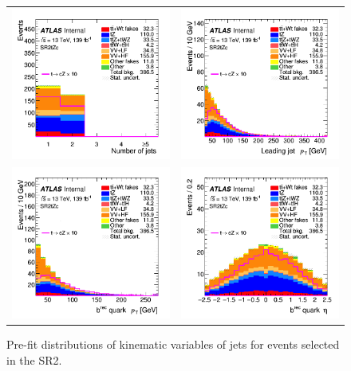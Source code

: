 \begin{figure}[]
	\centering
	\begin{tabular}{cc}
		\includegraphics[width=.35\textwidth]{Appendices/AP5/figures/SR2/nJets} &
		\includegraphics[width=.35\textwidth]{Appendices/AP5/figures/SR2/jet_pt} \\
		\includegraphics[width=.35\textwidth]{Appendices/AP5/figures/SR2/b_pt} & 
		\includegraphics[width=.35\textwidth]{Appendices/AP5/figures/SR2/b_eta} \\
	\end{tabular}
	\caption{Pre-fit distributions of kinematic variables of jets for events selected in the SR2\tZc.
		\ErrStatOnly
		\Blinded
	}%
	\label{fig:sel:sr2:jets}
\end{figure}

